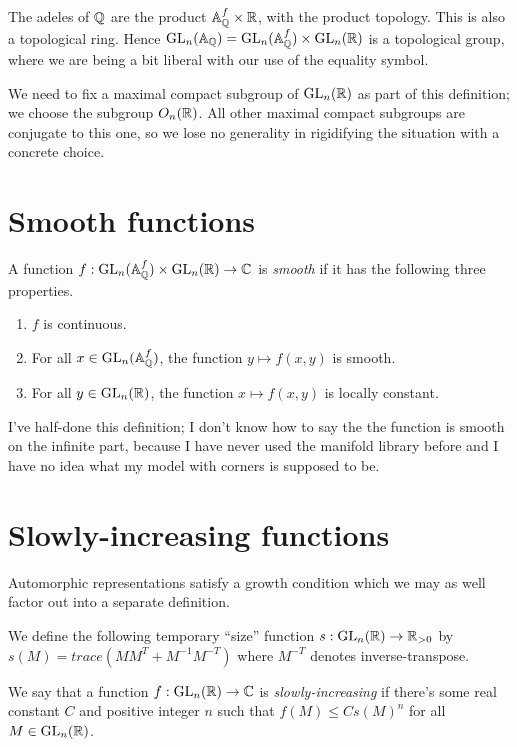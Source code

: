 The adeles of $\mathbb{Q}$ are the product $\mathbb{A}_{\mathbb{Q}}^f\times\mathbb{R}$, with the product topology. This
is also a topological ring. Hence $\operatorname{GL}_n(\mathbb{A}_{\mathbb{Q}})=\operatorname{GL}_n(\mathbb{A}_{\mathbb{Q}}^f)\times\operatorname{GL}_n(\mathbb{R})$ is a
topological group, where we are being a bit liberal with our use of the equality symbol.

We need to fix a maximal compact subgroup of $\operatorname{GL}_n(\mathbb{R})$ as part of this definition;
we choose the subgroup $O_n(\mathbb{R})$. All other maximal compact subgroups are conjugate
to this one, so we lose no generality in rigidifying the situation with a concrete choice.

\section{Smooth functions}

\begin{definition} A function $f:\operatorname{GL}_n(\mathbb{A}_{\mathbb{Q}}^f)\times\operatorname{GL}_n(\mathbb{R})\to\mathbb{C}$ is \emph{smooth}
  if it has the following three properties.

  \begin{enumerate}
    \item $f$ is continuous.
    \item For all $x\in\operatorname{GL}_n(\mathbb{A}_{\mathbb{Q}}^f)$, the function $y\mapsto f(x,y)$ is smooth.
    \item For all $y\in\operatorname{GL}_n(\mathbb{R})$, the function $x\mapsto f(x,y)$ is locally constant.
  \end{enumerate}
\end{definition}

I've half-done this definition; I don't know how to say the the function is smooth
on the infinite part, because I have never used the manifold library before and I have
no idea what my model with corners is supposed to be.

\section{Slowly-increasing functions}

Automorphic representations satisfy a growth condition which we may as well factor out
into a separate definition.

We define the following temporary ``size'' function $s:\operatorname{GL}_n(\mathbb{R})\to\mathbb{R}_{>0}$ by
$s(M)=trace(MM^T+M^{-1}M^{-T})$ where $M^{-T}$ denotes inverse-transpose.

\begin{definition} We say that a function $f:\operatorname{GL}_n(\mathbb{R})\to\mathbb{C}$ is \emph{slowly-increasing}
  if there's some real constant $C$ and positive integer $n$ such that $f(M)\leq Cs(M)^n$
  for all $M\in\operatorname{GL}_n(\mathbb{R})$.
\end{definition}

